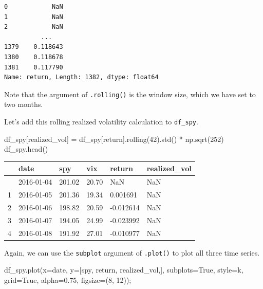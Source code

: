\documentclass[
  letterpaper,
  DIV=11,
  numbers=noendperiod]{scrreprt}
\newenvironment{Shaded}{\begin{snugshade}}{\end{snugshade}}
\newcommand{\DecValTok}[1]{\textcolor[rgb]{0.68,0.00,0.00}{#1}}
\newcommand{\FloatTok}[1]{\textcolor[rgb]{0.68,0.00,0.00}{#1}}
\newcommand{\NormalTok}[1]{\textcolor[rgb]{0.00,0.23,0.31}{#1}}
\newcommand{\OperatorTok}[1]{\textcolor[rgb]{0.37,0.37,0.37}{#1}}
\newcommand{\StringTok}[1]{\textcolor[rgb]{0.13,0.47,0.30}{#1}}
\newcommand{\VariableTok}[1]{\textcolor[rgb]{0.07,0.07,0.07}{#1}}
\begin{document}
\begin{verbatim}
0            NaN
1            NaN
2            NaN
          ...   
1379    0.118643
1380    0.118678
1381    0.117790
Name: return, Length: 1382, dtype: float64
\end{verbatim}

Note that the argument of \texttt{.rolling()} is the window size, which
we have set to two months.

Let's add this rolling realized volatility calculation to
\texttt{df\_spy}.

\begin{Shaded}
\begin{Highlighting}[]
\NormalTok{df\_spy[}\StringTok{\textquotesingle{}realized\_vol\textquotesingle{}}\NormalTok{] }\OperatorTok{=}\NormalTok{ df\_spy[}\StringTok{\textquotesingle{}return\textquotesingle{}}\NormalTok{].rolling(}\DecValTok{42}\NormalTok{).std() }\OperatorTok{*}\NormalTok{ np.sqrt(}\DecValTok{252}\NormalTok{)}
\NormalTok{df\_spy.head()}
\end{Highlighting}
\end{Shaded}

\begin{longtable}[]{@{}llllll@{}}
\toprule\noalign{}
& date & spy & vix & return & realized\_vol \\
\midrule\noalign{}
\endhead
\bottomrule\noalign{}
\endlastfoot
0 & 2016-01-04 & 201.02 & 20.70 & NaN & NaN \\
1 & 2016-01-05 & 201.36 & 19.34 & 0.001691 & NaN \\
2 & 2016-01-06 & 198.82 & 20.59 & -0.012614 & NaN \\
3 & 2016-01-07 & 194.05 & 24.99 & -0.023992 & NaN \\
4 & 2016-01-08 & 191.92 & 27.01 & -0.010977 & NaN \\
\end{longtable}

Again, we can use the \texttt{subplot} argument of \texttt{.plot()} to
plot all three time series.

\begin{Shaded}
\begin{Highlighting}[]
\NormalTok{df\_spy.plot(x}\OperatorTok{=}\StringTok{\textquotesingle{}date\textquotesingle{}}\NormalTok{, y}\OperatorTok{=}\NormalTok{[}\StringTok{\textquotesingle{}spy\textquotesingle{}}\NormalTok{, }\StringTok{\textquotesingle{}return\textquotesingle{}}\NormalTok{, }\StringTok{\textquotesingle{}realized\_vol\textquotesingle{}}\NormalTok{,], subplots}\OperatorTok{=}\VariableTok{True}\NormalTok{, style}\OperatorTok{=}\StringTok{\textquotesingle{}k\textquotesingle{}}\NormalTok{, grid}\OperatorTok{=}\VariableTok{True}\NormalTok{, alpha}\OperatorTok{=}\FloatTok{0.75}\NormalTok{, figsize}\OperatorTok{=}\NormalTok{(}\DecValTok{8}\NormalTok{, }\DecValTok{12}\NormalTok{))}\OperatorTok{;}
\end{Highlighting}
\end{Shaded}
\end{document}
